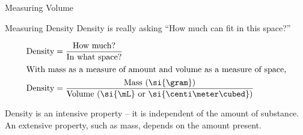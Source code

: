 \documentclass[notes=show]{beamer}
\begin{document}

\begin{frame}{Measuring Volume}
	\begin{center}
\end{center}
\end{frame}


\begin{frame}{Measuring Density}
	Density is really asking ``How much can fit in this space?''

	\begin{align*}
		\text{Density} &= \frac{\text{How much?}}{\text{In what space?}}
		\\
		\intertext{With mass as a measure of amount and volume as a
		measure of space,}
		\text{Density} &= \frac{\text{Mass (\si{\gram})}}{\text{Volume
		(\si{\mL} or \si{\centi\meter\cubed})}}
	\end{align*}

	Density is an \alert{intensive property} -- it is independent of the
	amount of substance. An \alert{extensive property}, such as mass, depends
	on the amount present.
\end{frame}
\end{document}
